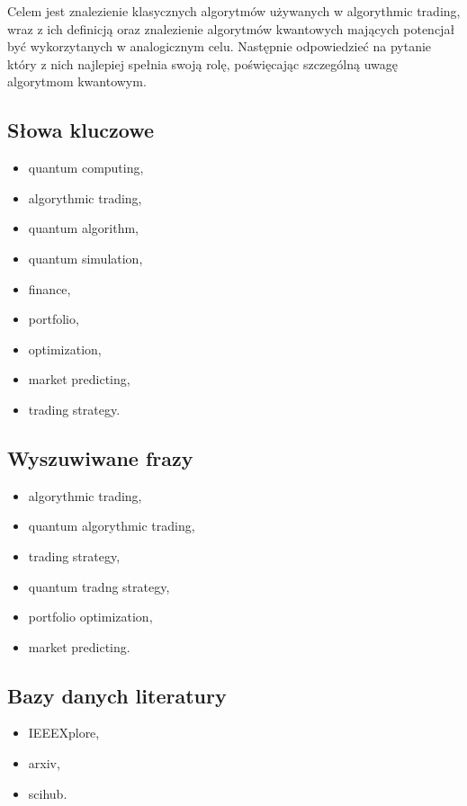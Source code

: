 \documentclass[polish,envcountsect,10pt]{article}
\begin{document}
Celem jest znalezienie klasycznych algorytmów używanych w algorythmic trading, wraz z ich definicją oraz znalezienie algorytmów kwantowych mających potencjał być wykorzytanych w analogicznym celu. Następnie odpowiedzieć na pytanie który z nich najlepiej spełnia swoją rolę, poświęcając szczególną uwagę algorytmom kwantowym. 

\subsection{Słowa kluczowe}

\begin{itemize}
	\item quantum computing,
	\item algorythmic trading,
	\item quantum algorithm,
	\item quantum simulation,
	\item finance,
	\item portfolio, 
	\item optimization,
	\item market predicting,
	\item trading strategy.
\end{itemize}

\subsection{Wyszuwiwane frazy}

\begin{itemize}
	\item algorythmic trading,
	\item quantum algorythmic trading,
	\item trading strategy,
	\item quantum tradng strategy,
	\item portfolio optimization,
	\item market predicting.
\end{itemize}


\subsection{Bazy danych literatury}

\begin{itemize}
	\item IEEEXplore,
	\item arxiv,
	\item scihub.
\end{itemize}
\end{document}
